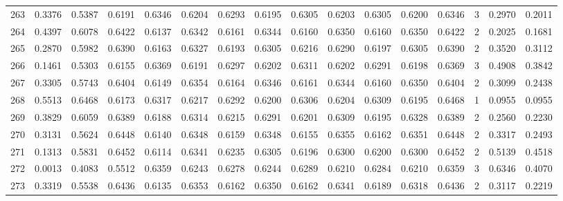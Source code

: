 \begin{tabular}{lrrrrrrrrrrrrrrr}
263 &      0.3376 &  0.5387 &  0.6191 &  0.6346 &  0.6204 &  0.6293 &  0.6195 &  0.6305 &  0.6203 &  0.6305 &   0.6200 &     0.6346 &      3 &                    0.2970 &                     0.2011 \\
264 &      0.4397 &  0.6078 &  0.6422 &  0.6137 &  0.6342 &  0.6161 &  0.6344 &  0.6160 &  0.6350 &  0.6160 &   0.6350 &     0.6422 &      2 &                    0.2025 &                     0.1681 \\
265 &      0.2870 &  0.5982 &  0.6390 &  0.6163 &  0.6327 &  0.6193 &  0.6305 &  0.6216 &  0.6290 &  0.6197 &   0.6305 &     0.6390 &      2 &                    0.3520 &                     0.3112 \\
266 &      0.1461 &  0.5303 &  0.6155 &  0.6369 &  0.6191 &  0.6297 &  0.6202 &  0.6311 &  0.6202 &  0.6291 &   0.6198 &     0.6369 &      3 &                    0.4908 &                     0.3842 \\
267 &      0.3305 &  0.5743 &  0.6404 &  0.6149 &  0.6354 &  0.6164 &  0.6346 &  0.6161 &  0.6344 &  0.6160 &   0.6350 &     0.6404 &      2 &                    0.3099 &                     0.2438 \\
268 &      0.5513 &  0.6468 &  0.6173 &  0.6317 &  0.6217 &  0.6292 &  0.6200 &  0.6306 &  0.6204 &  0.6309 &   0.6195 &     0.6468 &      1 &                    0.0955 &                     0.0955 \\
269 &      0.3829 &  0.6059 &  0.6389 &  0.6188 &  0.6314 &  0.6215 &  0.6291 &  0.6201 &  0.6309 &  0.6195 &   0.6328 &     0.6389 &      2 &                    0.2560 &                     0.2230 \\
270 &      0.3131 &  0.5624 &  0.6448 &  0.6140 &  0.6348 &  0.6159 &  0.6348 &  0.6155 &  0.6355 &  0.6162 &   0.6351 &     0.6448 &      2 &                    0.3317 &                     0.2493 \\
271 &      0.1313 &  0.5831 &  0.6452 &  0.6114 &  0.6341 &  0.6235 &  0.6305 &  0.6196 &  0.6300 &  0.6200 &   0.6300 &     0.6452 &      2 &                    0.5139 &                     0.4518 \\
272 &      0.0013 &  0.4083 &  0.5512 &  0.6359 &  0.6243 &  0.6278 &  0.6244 &  0.6289 &  0.6210 &  0.6284 &   0.6210 &     0.6359 &      3 &                    0.6346 &                     0.4070 \\
273 &      0.3319 &  0.5538 &  0.6436 &  0.6135 &  0.6353 &  0.6162 &  0.6350 &  0.6162 &  0.6341 &  0.6189 &   0.6318 &     0.6436 &      2 &                    0.3117 &                     0.2219 \\

\end{tabular}
